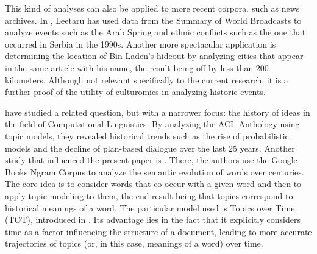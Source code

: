 This kind of analyses can also be applied to more recent corpora, such as news archives. In , Leetaru has used data from the Summary of World Broadcasts to analyze events such as the Arab Spring and ethnic conflicts such as the one that occurred in Serbia in the 1990s. Another more spectacular application is determining the location of Bin Laden's hideout by analyzing cities that appear in the same article with his name, the result being off by less than 200 kilometers. Although not relevant specifically to the current research, it is a further proof of the utility of culturomics in analyzing historic events.

 have studied a related question, but with a narrower focus: the history of ideas in the field of Computational Linguistics. By analyzing the ACL Anthology using topic models, they revealed historical trends such as the rise of probabilistic models and the decline of plan-based dialogue over the last 25 years. Another study that influenced the present paper is . There, the authors use the Google Books Ngram Corpus to analyze the semantic evolution of words over centuries. The core idea is to consider words that co-occur with a given word and then to apply topic modeling to them, the end result being that topics correspond to historical meanings of a word. The particular model used is Topics over Time (TOT), introduced in . Its advantage lies in the fact that it explicitly considers time as a factor influencing the structure of a document, leading to more accurate trajectories of topics (or, in this case, meanings of a word) over time.
